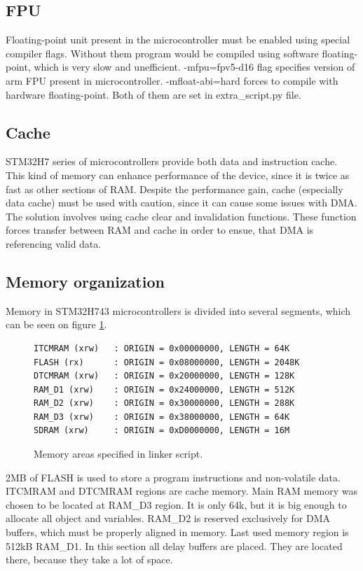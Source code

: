 \documentclass[a4paper,twoside,12pt]{book}
\begin{document}
\subsection{FPU}

Floating-point unit present in the microcontroller must be enabled
using special compiler flags. Without them program would be compiled
using software floating-point, which is very slow and unefficient.
-mfpu=fpv5-d16 flag specifies version of arm FPU present in microcontroller.
-mfloat-abi=hard forces to compile with hardware floating-point.
Both of them are set in extra\_script.py file.

\subsection{Cache}

STM32H7 series of microcontrollers provide both data and instruction cache.
This kind of memory can enhance performance of the device,
since it is twice as fast as other sections of RAM.
Despite the performance gain, cache (especially data cache)
must be used with caution, since it can cause some issues with DMA.
\cite{dma}
The solution involves using cache clear and invalidation functions.
These function forces transfer between RAM and cache in order to ensue,
that DMA is referencing valid data.

\subsection{Memory organization}
Memory in STM32H743 microcontrollers is divided into several segments,
which can be seen on figure \ref{fig:mem}.

\begin{figure}[H]
\centering
\begin{lstlisting}
ITCMRAM (xrw)   : ORIGIN = 0x00000000, LENGTH = 64K
FLASH (rx)      : ORIGIN = 0x08000000, LENGTH = 2048K
DTCMRAM (xrw)   : ORIGIN = 0x20000000, LENGTH = 128K
RAM_D1 (xrw)    : ORIGIN = 0x24000000, LENGTH = 512K
RAM_D2 (xrw)    : ORIGIN = 0x30000000, LENGTH = 288K
RAM_D3 (xrw)    : ORIGIN = 0x38000000, LENGTH = 64K
SDRAM (xrw)     : ORIGIN = 0xD0000000, LENGTH = 16M
\end{lstlisting}
\caption{Memory areas specified in linker script.}
\label{fig:mem}
\end{figure}

2MB of FLASH is used to store a program instructions and non-volatile data.
ITCMRAM and DTCMRAM regions are cache memory.
Main RAM memory was chosen to be located at RAM\_D3 region.
It is only 64k, but it is big enough to allocate all object and variables.
RAM\_D2 is reserved exclusively for DMA buffers,
which must be properly aligned in memory.
Last used memory region is 512kB RAM\_D1.
In this section all delay buffers are placed.
They are located there, because they take a lot of space.
\end{document}
